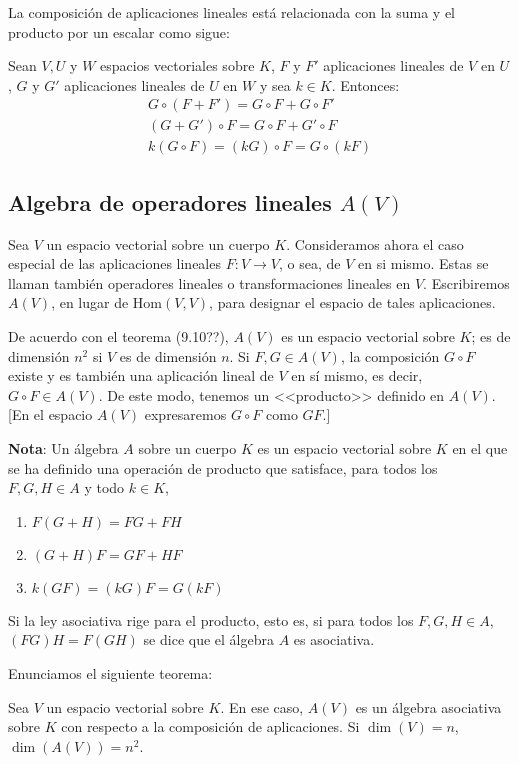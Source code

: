 La composición de aplicaciones lineales está relacionada con la suma y el producto por un escalar como sigue:

Sean \(V, U\) y \(W\) espacios vectoriales sobre \(K\), \(F\) y \(F'\) aplicaciones lineales de \(V\) en \(U\), \(G\) y \(G'\) aplicaciones lineales de \(U\) en \(W\) y sea \(k \in K\). Entonces:
\begin{align*}
  G \circ (F+F') = G\circ F + G \circ F'\\
  (G+G') \circ F = G \circ F + G' \circ F \\
  k(G\circ F) = (kG) \circ F = G \circ (kF)
\end{align*}

\subsection{Algebra de operadores lineales \(A(V)\)}

Sea \(V\) un espacio vectorial sobre un cuerpo \(K\). Consideramos ahora el caso especial de las aplicaciones lineales \(F:V\rightarrow V\), o sea, de \(V\) en si mismo. Estas se llaman también operadores lineales o transformaciones lineales en \(V\). Escribiremos \(A(V)\), en lugar de \(\text{Hom}(V,V)\), para designar el espacio de tales aplicaciones.

De acuerdo con el teorema (9.10??), \(A(V)\) es un espacio vectorial sobre \(K\); es de dimensión \(n^2\) si \(V\) es de dimensión \(n\). Si \(F,G \in A(V)\), la composición \(G \circ F\) existe y es también una aplicación lineal de \(V\) en sí mismo, es decir, \(G\circ F \in A(V)\). De este modo, tenemos un <<producto>> definido en \(A(V)\).[En el espacio \(A(V)\) expresaremos \(G \circ F\) como \(GF\).]

\textbf{Nota}: Un álgebra \(A\) sobre un cuerpo \(K\) es un espacio vectorial sobre \(K\) en el que se ha definido una operación de producto que satisface, para todos los \(F,G,H \in A\) y todo \(k \in K\),
\begin{enumerate}
  \item \(F(G+H)=FG+FH\)
  \item \((G+H)F = GF+HF\)
  \item \(k(GF)=(kG)F = G(kF)\)
\end{enumerate}
Si la ley asociativa rige para el producto, esto es, si para todos los \(F,G,H \in A\), \((FG)H = F(GH)\) se dice que el álgebra \(A\) es asociativa.

Enunciamos el siguiente teorema:

Sea \(V\) un espacio vectorial sobre \(K\). En ese caso, \(A(V)\) es un álgebra asociativa sobre \(K\) con respecto a la composición de aplicaciones. Si \(\dim(V) = n\), \(\dim(A(V))=n^2\).

